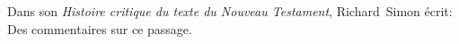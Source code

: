\documentclass[a4paper]{article}
\begin{document}
Dans son \emph{Histoire critique du texte du Nouveau Testament}, Richard~Simon écrit:
Des commentaires sur ce passage.
\end{document}

